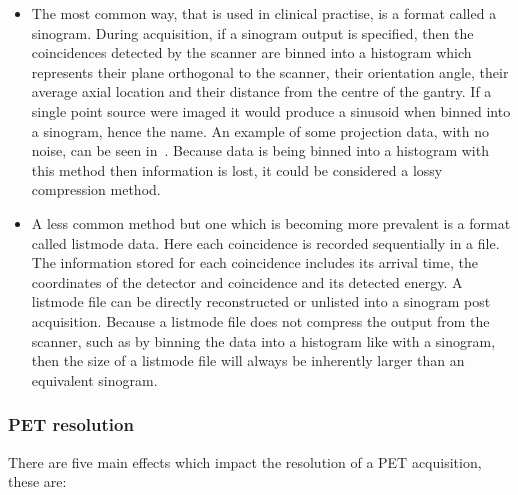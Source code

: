                 \begin{itemize}
                    \item The most common way, that is used in clinical practise, is a format called a sinogram. During acquisition, if a sinogram output is specified, then the coincidences detected by the scanner are binned into a histogram which represents their plane orthogonal to the scanner, their orientation angle, their average axial location and their distance from the centre of the gantry. If a single point source were imaged it would produce a sinusoid when binned into a sinogram, hence the name. An example of some projection data, with no noise, can be seen in~. Because data is being binned into a histogram with this method then information is lost, it could be considered a lossy compression method.
                    
                    \item A less common method but one which is becoming more prevalent is a format called listmode data. Here each coincidence is recorded sequentially in a file. The information stored for each coincidence includes its arrival time, the coordinates of the detector and coincidence and its detected energy. A listmode file can be directly reconstructed or unlisted into a sinogram post acquisition. Because a listmode file does not compress the output from the scanner, such as by binning the data into a histogram like with a sinogram, then the size of a listmode file will always be inherently larger than an equivalent sinogram.
                \end{itemize}
            
            \subsubsection{PET resolution} \label{sec:pet_resolution}
                There are five main effects which impact the resolution of a \gls{PET} acquisition, these are:
                
